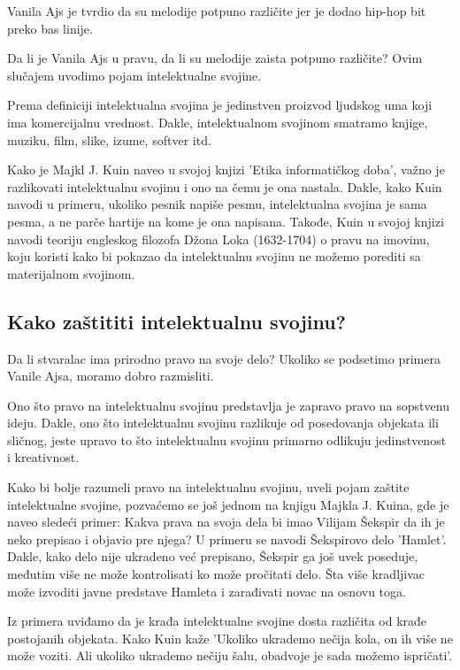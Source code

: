 \documentclass[a4paper]{article}
\begin{document}
Vanila Ajs je tvrdio da su melodije potpuno različite jer je dodao hip-hop bit preko bas linije. \cite{rollingstone}

Da li je Vanila Ajs u pravu, da li su melodije zaista potpuno različite? Ovim slučajem uvodimo pojam intelektualne svojine.

Prema definiciji intelektualna svojina je jedinstven proizvod ljudskog uma koji ima komercijalnu vrednost. \cite{texasUniv}
Dakle, intelektualnom svojinom smatramo knjige, muziku, film, slike, izume, softver itd.

Kako je Majkl J. Kuin naveo u svojoj knjizi 'Etika informatičkog doba', \cite{ethics} važno je razlikovati 
intelektualnu svojinu i ono na čemu je ona nastala. Dakle, kako Kuin navodi u primeru, ukoliko pesnik
napiše pesmu, intelektualna svojina je sama pesma, a ne parče hartije na kome je ona napisana.
Takođe, Kuin u svojoj knjizi navodi teoriju engleskog filozofa Džona Loka (1632-1704) o pravu na imovinu,
koju koristi kako bi pokazao da intelektualnu svojinu ne možemo porediti sa materijalnom svojinom.

\subsection{Kako zaštititi intelektualnu svojinu?}
Da li stvaralac ima prirodno pravo na svoje delo? Ukoliko se podsetimo primera Vanile Ajsa, moramo
dobro razmisliti.

Ono što pravo na intelektualnu svojinu predstavlja je zapravo pravo na sopstvenu ideju. Dakle, ono što 
intelektualnu svojinu razlikuje od posedovanja objekata ili sličnog, jeste upravo to što intelektualnu
svojinu primarno odlikuju jedinstvenost i kreativnost.

Kako bi bolje razumeli pravo na intelektualnu svojinu, uveli pojam zaštite intelektualne svojine,
pozvaćemo se još jednom na knjigu Majkla J. Kuina, \cite{ethics} gde je naveo sledeći primer: \newline 
Kakva prava na svoja dela bi imao Vilijam Šekspir da ih je neko prepisao i objavio pre njega? U primeru se navodi
Šekspirovo delo 'Hamlet'. Dakle, kako delo nije ukradeno već prepisano, Šekspir ga još uvek poseduje, međutim
više ne može kontrolisati ko može pročitati delo. Šta više  kradljivac može izvoditi javne predstave
Hamleta i zarađivati novac na osnovu toga.

Iz primera uviđamo da je krađa intelektualne svojine dosta različita od krađe postojanih objekata.
Kako Kuin kaže 'Ukoliko ukrademo nečija kola, on ih više ne može voziti. Ali ukoliko ukrademo nečiju šalu, 
obadvoje je sada možemo ispričati'.
\end{document}
